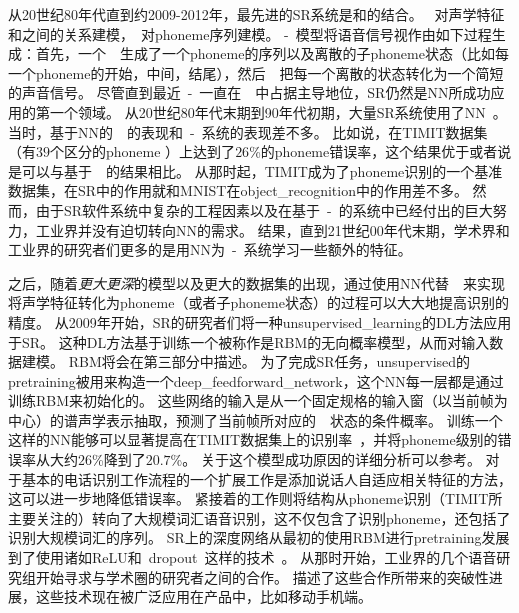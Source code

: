 从20世纪80年代直到约2009-2012年，最先进的\gls{SR}系统是和的结合。
~对声学特征和之间的关系建模\citep{Bahl87}，~对\gls{phoneme}序列建模。
-~模型将语音信号视作由如下过程生成：首先，一个~~生成了一个\gls{phoneme}的序列以及离散的子\gls{phoneme}状态（比如每一个\gls{phoneme}的开始，中间，结尾），然后~~把每一个离散的状态转化为一个简短的声音信号。
尽管直到最近~-~一直在~~中占据主导地位，\gls{SR}仍然是\gls{NN}所成功应用的第一个领域。
从20世纪80年代末期到90年代初期，大量\gls{SR}系统使用了\gls{NN}~\citep{Bourlard-cspla89,Waibel89b,Robinson+Fallside91,Bengio91z,Bengio92c,Konig96}。
当时，基于\gls{NN}的~~的表现和~-~系统的表现差不多。
比如说，\citet{Robinson+Fallside91}在TIMIT数据集\citep{garofolo1993darpa}（有$39$个区分的\gls{phoneme}%
）上达到了$26$\%的\gls{phoneme}错误率，这个结果优于或者说是可以与基于~~的结果相比。
从那时起，TIMIT成为了\gls{phoneme}识别的一个基准数据集，在\gls{SR}中的作用就和MNIST在\gls{object_recognition}中的作用差不多。
然而，由于\gls{SR}软件系统中复杂的工程因素以及在基于~-~的系统中已经付出的巨大努力，工业界并没有迫切转向\gls{NN}的需求。
结果，直到21世纪00年代末期，学术界和工业界的研究者们更多的是用\gls{NN}为~-~系统学习一些额外的特征。


之后，随着\emph{更大更深}的模型以及更大的数据集的出现，通过使用\gls{NN}代替~~来实现将声学特征转化为\gls{phoneme}（或者子\gls{phoneme}状态）的过程可以大大地提高识别的精度。
从2009年开始，\gls{SR}的研究者们将一种\gls{unsupervised_learning}的\gls{DL}方法应用于\gls{SR}。
这种\gls{DL}方法基于训练一个被称作是\gls{RBM}的无向概率模型，从而对输入数据建模。
 \gls{RBM}将会在第三部分中描述。
 为了完成\gls{SR}任务，\gls{unsupervised}的\gls{pretraining}被用来构造一个\gls{deep_feedforward_network}，这个\gls{NN}每一层都是通过训练\gls{RBM}来初始化的。
 这些网络的输入是从一个固定规格的输入窗（以当前帧为中心）的谱声学表示抽取，预测了当前帧所对应的~~状态的条件概率。
 训练一个这样的\gls{NN}能够可以显著提高在TIMIT数据集上的识别率~\citep{mohamed2009deep,Mohamed+Dahl+Hinton-2012}，并将\gls{phoneme}级别的错误率从大约$26$\%降到了$20.7$\%。
关于这个模型成功原因的详细分析可以参考\citet{mohamed2012understanding}。
对于基本的电话识别工作流程的一个扩展工作是添加说话人自适应相关特征\citep{mohamed2011deep}的方法，这可以进一步地降低错误率。
紧接着的工作则将结构从\gls{phoneme}识别（TIMIT所主要关注的）转向了大规模词汇语音识别\citep{Dahl2012}，这不仅包含了识别\gls{phoneme}，还包括了识别大规模词汇的序列。
\gls{SR}上的深度网络从最初的使用\gls{RBM}进行\gls{pretraining}发展到了使用诸如\gls{ReLU}和~\gls{dropout}~这样的技术~\citep{Zeiler+al-ICASSP-2013,Dahl-et-al-ICASSP2013}。
从那时开始，工业界的几个语音研究组开始寻求与学术圈的研究者之间的合作。
\citet{Hinton-et-al-2012}描述了这些合作所带来的突破性进展，这些技术现在被广泛应用在产品中，比如移动手机端。

